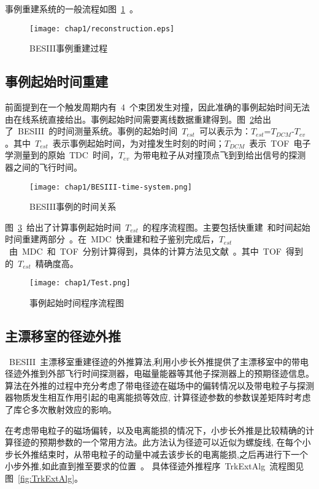 事例重建系统的一般流程如图~\ref{fig:reconstruction}~。

\begin{figure}[!h]
  \centering
  \texttt{[image: chap1/reconstruction.eps]}
  \caption{BESIII事例重建过程}
  \label{fig:reconstruction}
\end{figure}

\subsection{事例起始时间重建}

前面提到在一个触发周期内有~4~个束团发生对撞，因此准确的事例起始时间无法由在线系统直接给出。事例起始时间需要离线数据重建得到。图~\ref{fig:BESIII-time-system}给出了~BESIII~的时间测量系统。事例的起始时间~$T_{est}$~可以表示为：$T_{est}$=$T_{DCM}$-$T_{ev}$。其中~$T_{est}$~表示事例起始时间，为对撞发生时刻的时间；$T_{DCM}$~表示~TOF~电子学测量到的原始~TDC~时间，$T_{ev}$~为带电粒子从对撞顶点飞到到给出信号的探测器之间的飞行时间。
\begin{figure}[!h]
  \centering
  \texttt{[image: chap1/BESIII-time-system.png]}
  \caption{BESIII事例的时间关系}
  \label{fig:BESIII-time-system}
\end{figure}

图~\ref{fig:Test}~给出了计算事例起始时间~$T_{est}$~的程序流程图。主要包括快重建~\cite{zhangxm:2005}和时间起始时间重建两部分~\cite{max:2007}。在~MDC~快重建和粒子鉴别完成后，$T_{est}$~由~MDC~和~TOF~分别计算得到，具体的计算方法见文献~\cite{Maxiang:2008}。其中~TOF~得到的~$T_{est}$~精确度高。

\begin{figure}[!h]
  \centering
  \texttt{[image: chap1/Test.png]}
  \caption{事例起始时间程序流程图}
  \label{fig:Test}
\end{figure}
\subsection{主漂移室的径迹外推}

~BESIII~主漂移室重建径迹的外推算法,利用小步长外推提供了主漂移室中的带电径迹外推到外部飞行时间探测器，电磁量能器等其他子探测器上的预期径迹信息。算法在外推的过程中充分考虑了带电径迹在磁场中的偏转情况以及带电粒子与探测器物质发生相互作用引起的电离能损等效应, 计算径迹参数的参数误差矩阵时考虑了库仑多次散射效应的影响。

在考虑带电粒子的磁场偏转，以及电离能损的情况下，小步长外推是比较精确的计算径迹的预期参数的一个常用方法。此方法认为径迹可以近似为螺旋线, 在每个小步长外推结束时，从带电粒子的动量中减去该步长的电离能损,之后再进行下一个小步外推,如此直到推至要求的位置~\cite{wangll:2014}。
具体径迹外推程序~TrkExtAlg~流程图见图~\ref{fig:TrkExtAlg}。

